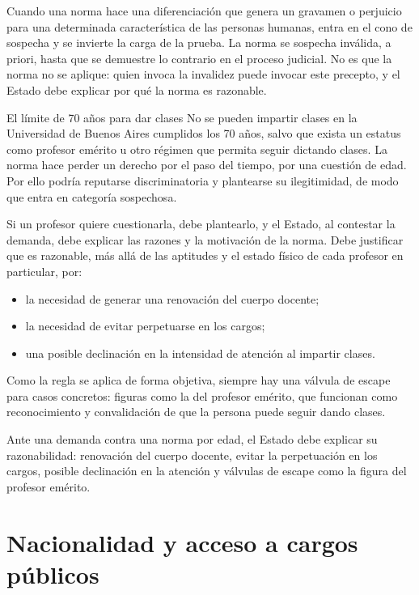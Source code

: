 \documentclass[12pt,oneside]{book}
\begin{document}
Cuando una norma hace una diferenciación que genera un gravamen o perjuicio para una determinada característica de las personas humanas, entra en el cono de sospecha y se invierte la carga de la prueba. La norma se sospecha inválida, a priori, hasta que se demuestre lo contrario en el proceso judicial. No es que la norma no se aplique: quien invoca la invalidez puede invocar este precepto, y el Estado debe explicar por qué la norma es razonable.

\begin{example}{El límite de 70 años para dar clases}
No se pueden impartir clases en la Universidad de Buenos Aires cumplidos los 70 años, salvo que exista un estatus como profesor emérito u otro régimen que permita seguir dictando clases. La norma hace perder un derecho por el paso del tiempo, por una cuestión de edad. Por ello podría reputarse discriminatoria y plantearse su ilegitimidad, de modo que entra en categoría sospechosa.

Si un profesor quiere cuestionarla, debe plantearlo, y el Estado, al contestar la demanda, debe explicar las razones y la motivación de la norma. Debe justificar que es razonable, más allá de las aptitudes y el estado físico de cada profesor en particular, por:
\begin{itemize}
    \item la necesidad de generar una renovación del cuerpo docente;
    \item la necesidad de evitar perpetuarse en los cargos;
    \item una posible declinación en la intensidad de atención al impartir clases.
\end{itemize}
Como la regla se aplica de forma objetiva, siempre hay una válvula de escape para casos concretos: figuras como la del profesor emérito, que funcionan como reconocimiento y convalidación de que la persona puede seguir dando clases.
\end{example}

\begin{important}
Ante una demanda contra una norma por edad, el Estado debe explicar su razonabilidad: renovación del cuerpo docente, evitar la perpetuación en los cargos, posible declinación en la atención y válvulas de escape como la figura del profesor emérito.
\end{important}

\section{Nacionalidad y acceso a cargos públicos}
\end{document}

